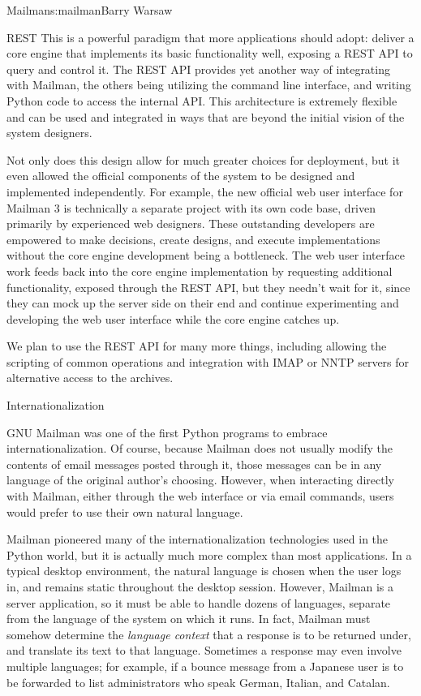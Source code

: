 \begin{aosachapter}{Mailman}{s:mailman}{Barry Warsaw}
\begin{aosasect1}{REST}
This is a powerful paradigm that more applications should adopt:
deliver a core engine that implements its basic functionality well,
exposing a REST API to query and control it.  The REST API provides
yet another way of integrating with Mailman, the others being
utilizing the command line interface, and writing Python code to
access the internal API.  This architecture is extremely flexible and
can be used and integrated in ways that are beyond the initial vision
of the system designers.

Not only does this design allow for much greater choices for
deployment, but it even allowed the official components of the system
to be designed and implemented independently.  For example, the new
official web user interface for Mailman 3 is technically a separate
project with its own code base, driven primarily by experienced web
designers.  These outstanding developers are empowered to make
decisions, create designs, and execute implementations without the
core engine development being a bottleneck.  The web user interface
work feeds back into the core engine implementation by requesting
additional functionality, exposed through the REST API, but they
needn't wait for it, since they can mock up the server side on their
end and continue experimenting and developing the web user interface
while the core engine catches up.

We plan to use the REST API for many more things, including allowing
the scripting of common operations and integration with IMAP or
NNTP servers for alternative access to the archives.

\end{aosasect1}

\begin{aosasect1}{Internationalization}

GNU Mailman was one of the first Python programs to embrace
internationalization.  Of course, because Mailman does not usually
modify the contents of email messages posted through it, those
messages can be in any language of the original author's choosing.
However, when interacting directly with Mailman, either through the
web interface or via email commands, users would prefer to use their
own natural language.

Mailman pioneered many of the internationalization technologies used in the Python 
world, but it is actually much more complex
than most applications.  In a typical desktop environment, the natural
language is chosen when the user logs in, and remains static
throughout the desktop session.  However, Mailman is a server
application, so it must be able to handle dozens of languages,
separate from the language of the system on which it runs.  In fact,
Mailman must somehow determine the \emph{language context} that a
response is to be returned under, and translate its text to that
language.  Sometimes a response may even involve multiple languages;
for example, if a bounce message from a Japanese user is to be
forwarded to list administrators who speak German, Italian, and
Catalan.


\end{aosasect1}
\end{aosachapter}
